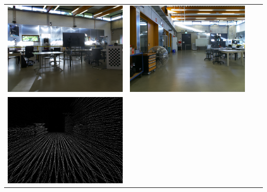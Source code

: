 \documentclass[english, bachelor, utf8]{base/thesis_telematics}
\begin{document}
\begin{table}[h]
\begin{tabular}{
  >{\centering\arraybackslash}m{}
  >{\centering\arraybackslash}m{}
  >{\centering\arraybackslash}m{}
  >{\centering\arraybackslash}m{}
}
    \includegraphics[width=\linewidth]{pics/robo/robo_3/image.png} &
    \includegraphics[width=\linewidth]{pics/robo/robo_4/image.png} \\
    \includegraphics[width=\linewidth]{pics/robo/robo_1/depth0016_aligned.png} &

\end{tabular}
\end{table}
\end{document}
